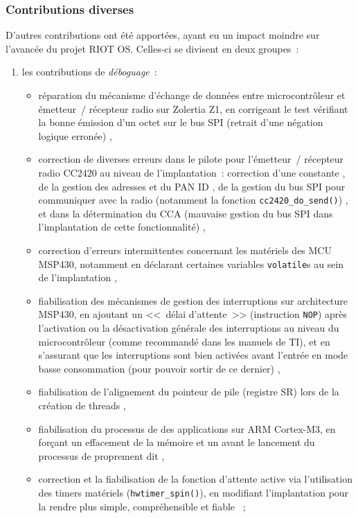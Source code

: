 \subsubsection{Contributions diverses}
\label{ParRIOTContribDiverses}

D'autres contributions ont été apportées, ayant eu un impact moindre sur
l'avancée du projet RIOT OS. Celles-ci se divisent en deux groupes~:

\begin{enumerate}

\item les contributions de \emph{déboguage}~:
\begin{itemize}
\item réparation du mécanisme d'échange de données entre microcontrôleur et
émetteur~/ récepteur radio sur Zolertia Z1, en corrigeant le test vérifiant
la bonne émission d'un octet sur le bus SPI (retrait d'une négation logique
erronée) \cite{PRriotDebug9},
\item correction de diverses erreurs dans le pilote pour l'émetteur~/
récepteur radio CC2420 au niveau de l'implantation~: correction d'une
constante \cite{PRriotDebug3}, de la gestion des adresses et du PAN ID
\cite{PRriotDebug2}, de la gestion du bus SPI pour communiquer avec
la radio (notamment la fonction \texttt{cc2420\_do\_send()})
\cite{PRriotDebug7}, et dans la détermination du CCA (mauvaise gestion
du bus SPI dans l'implantation de cette fonctionnalité) \cite{PRriotDebug8},
\item correction d'erreurs intermittentes concernant les 
matériels des MCU MSP430, notamment en déclarant certaines variables
\texttt{volatile}s au sein de l'implantation \cite{PRriotDebug4},
\item fiabilisation des mécanismes de gestion des interruptions sur
architecture MSP430, en ajoutant un <<~délai d'attente~>> (instruction
\texttt{NOP}) après l'activation ou la désactivation générale des
interruptions au niveau du microcontrôleur (comme recommandé dans les
manuels de TI), et en s'assurant que les interruptions sont bien activées
avant l'entrée en mode basse consommation (pour pouvoir sortir de ce
dernier) \cite{PRriotDebug10},
\item fiabilisation de l'alignement du pointeur de pile (registre SR)
lors de la création de threads \cite{PRriotDebug1},
\item fiabilisation du processus de  des applications sur
ARM Cortex-M3, en forçant un effacement de la mémoire et un 
avant le lancement du processus de  proprement dit
\cite{PRriotDebug6},
\item correction et la fiabilisation de la fonction d'attente active via
l'utilisation des timers matériels (\texttt{hwtimer\_spin()}), en modifiant
l'implantation pour la rendre plus simple, compréhensible et fiable
\cite{PRriotDebug5}~;
\end{itemize}


\end{enumerate}
